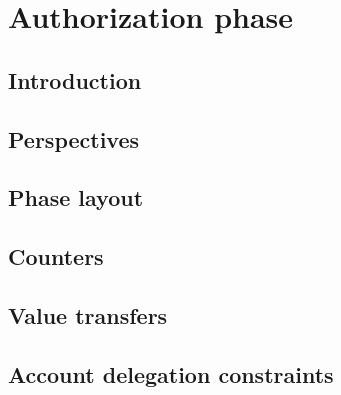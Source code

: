 
\section{Authorization phase                    \lispDone{}}      \label{hub: authorization phase}
\subsection{Introduction                        \lispDone{}}      \label{hub: authorization phase: intro}                            
\subsection{Perspectives                        \lispDone{}}      \label{hub: authorization phase: perspectives}                     
\subsection{Phase layout                        \lispDone{}}      \label{hub: authorization phase: phase layout}                     
\subsection{Counters                            \lispDone{}}      \label{hub: authorization phase: counters}                         
\subsection{Value transfers                     \lispDone{}}      \label{hub: authorization phase: data transfers}                   
\subsection{Account delegation constraints      \lispDone{}}      \label{hub: authorization phase: account delegation constraints}   

